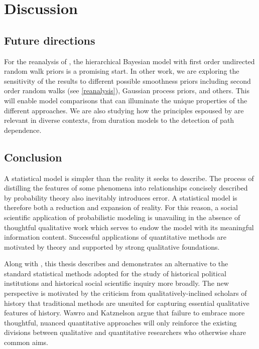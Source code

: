 \chapter{Discussion}
\label{discussion}

\section{Future directions}

For the reanalysis of , the hierarchical Bayesian model with first order 
undirected random walk priors is a promising start. In other work, we are exploring the sensitivity of the 
results to different possible smoothness priors including second order random walks (see \ref{reanalysis}), 
Gaussian process priors, and others. This will enable model comparisons that can illuminate the unique 
properties of the different approaches. We are also studying how the principles 
espoused by  are relevant in diverse contexts, from 
duration models to the detection of path dependence. 
 
\section{Conclusion}

A statistical model is simpler than the reality it seeks to describe. The process of 
distilling the features of some phenomena into relationships concisely described by  
probability theory also inevitably introduces error. A statistical model is therefore both 
a reduction and expansion of reality. For this reason, a social scientific application of 
probabilistic modeling is unavailing in the absence of thoughtful qualitative work which
serves to endow the model with its meaningful information content.
Successful applications of quantitative methods are motivated by theory and supported by 
strong qualitative foundations. 

Along with , this thesis describes and demonstrates 
an alternative to the standard statistical methods adopted for the study of historical 
political institutions and historical social scientific inquiry more broadly. The new perspective is 
motivated by the criticism from qualitatively-inclined scholars of history that traditional methods 
are unsuited for capturing essential qualitative features of history. 
Wawro and Katznelson argue that failure to embrace more thoughtful, nuanced quantitative 
approaches will only reinforce the existing divisions between qualitative and quantitative 
researchers who otherwise share common aims. 


